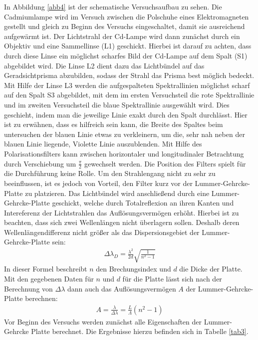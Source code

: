 In Abbildung \ref{abb4} ist der schematische Versuchsaufbau zu sehen. Die Cadmiumlampe
wird im Versuch zwischen die Polschuhe eines Elektromagneten gestellt und gleich zu
Beginn des Versuchs eingeschaltet, damit sie ausreichend aufgewärmt ist.
Der Lichtstrahl der Cd-Lampe wird dann zunächst durch ein Objektiv und eine Sammellinse (L1)
geschickt. Hierbei ist darauf zu achten, dass durch diese Linse ein möglichst scharfes
Bild der Cd-Lampe auf dem Spalt (S1) abgebildet wird. Die Linse L2 dient dazu das Lichtbündel
auf das Geradsichtprisma abzubilden, sodass der Strahl das Prisma best möglich bedeckt.
Mit Hilfe der Linse L3 werden die aufgespalteten Spektrallinien möglichst scharf auf den
Spalt S3 abgebildet, mit dem im ersten Versuchsteil die rote Spektrallinie und im zweiten
Versuchsteil die blaue Spektrallinie ausgewählt wird. Dies geschieht, indem man die jeweilige
Linie exakt durch den Spalt durchlässt. Hier ist zu erwähnen, dass es hilfreich sein kann, die
Breite des Spaltes beim untersuchen der blauen Linie etwas zu verkleinern, um die, sehr nah neben
der blauen Linie liegende, Violette Linie auszublenden.
Mit Hilfe des Polarisationsfilters kann zwischen horizontaler und longitudinaler Betrachtung durch
Verschiebung um $\frac{\pi}{2}$ gewechselt werden. Die Position des Filters spielt für die Durchführung
keine Rolle. Um den Strahlengang nicht zu sehr zu beeinflussen, ist es jedoch von Vorteil, den Filter
kurz vor der Lummer-Gehrcke-Platte zu platzieren.
Das Lichtbündel wird anschließend durch eine Lummer-Gehrcke-Platte geschickt, welche durch
Totalreflexion an ihren Kanten und Intereferenz der Lichtstrahlen das Auflösungsvermögen erhöht.
Hierbei ist zu beachten, dass sich zwei Wellenlängen nicht überlagern sollen. Deshalb deren
Wellenlängendifferenz nicht größer als das Dispersionsgebiet der Lummer-Gehrcke-Platte sein:
\begin{align*}
    \Delta \lambda_D =\frac{\lambda^2}{2d}\sqrt{\frac{1}{n^2-1}}
\end{align*}
In dieser Formel beschreibt $n$ den Brechungsindex und $d$ die Dicke der Platte.
Mit den gegebenen Daten für $n$ und $d$ für die Platte lässt sich nach der Berechnung von
$\Delta \lambda$ dann auch das Auflösungsvermögen $A$ der Lummer-Gehrcke-Platte berechnen:
\begin{align*}
    A = \frac{\lambda}{\Delta\lambda}=\frac{L}{\Lambda}(n^2-1)
\end{align*}
Vor Beginn des Versuchs werden zunächst alle Eigenschaften der Lummer-Gehrcke Platte berechnet.
Die Ergebnisse hierzu befinden sich in Tabelle \ref{tab3}.


